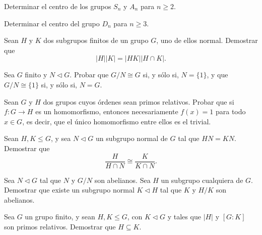 \begin{ejercicio}
    Determinar el centro de los grupos $S_n$ y $A_n$ para $n\geq 2$.
\end{ejercicio}

\begin{ejercicio}
    Determinar el centro del grupo $D_n$ para $n\geq 3$.
\end{ejercicio}

\begin{ejercicio}
    Sean $H$ y $K$ dos subgrupos finitos de un grupo $G$, uno de ellos normal. Demostrar que
    \[
        |H||K| = |HK||H\cap K|.
    \]
\end{ejercicio}

\begin{ejercicio}
    Sea $G$ finito y $N\lhd G$. Probar que $G/N\cong G$ si, y sólo si, $N=\{1\}$, y que $G/N\cong \{1\}$ si, y sólo si, $N=G$.
\end{ejercicio}

\begin{ejercicio}
    Sean $G$ y $H$ dos grupos cuyos órdenes sean primos relativos. Probar que si $f:G\to H$ es un homomorfismo, entonces necesariamente $f(x)=1$ para todo $x\in G$, es decir, que el único homomorfismo entre ellos es el trivial.
\end{ejercicio}

\begin{ejercicio}
    Sean $H,K\leq G$, y sea $N\lhd G$ un subgrupo normal de $G$ tal que $HN=KN$. Demostrar que
    \[
        \frac{H}{H\cap N}\cong \frac{K}{K\cap N}.
    \]
\end{ejercicio}

\begin{ejercicio}
    Sea $N\lhd G$ tal que $N$ y $G/N$ son abelianos. Sea $H$ un subgrupo cualquiera de $G$. Demostrar que existe un subgrupo normal $K\lhd H$ tal que $K$ y $H/K$ son abelianos.
\end{ejercicio}

\begin{ejercicio}
    Sea $G$ un grupo finito, y sean $H,K\leq G$, con $K\lhd G$ y tales que $|H|$ y $[G:K]$ son primos relativos. Demostrar que $H\subseteq K$.
\end{ejercicio}

